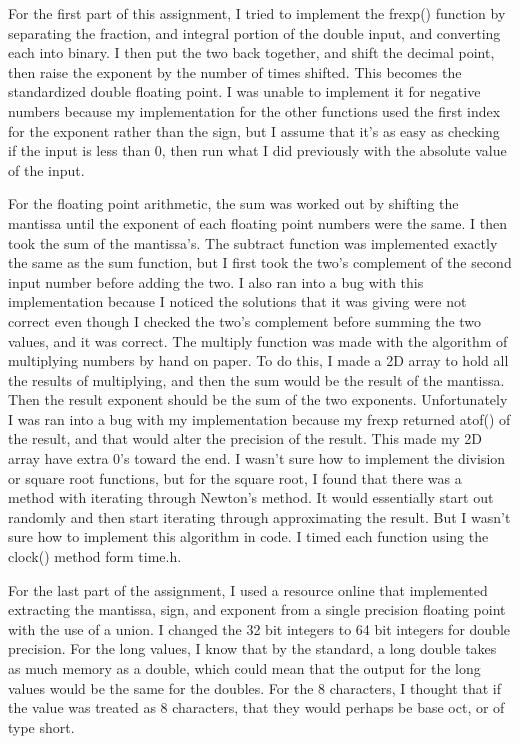 \documentclass[letterpaper,10pt,titlepage]{article}
\begin{document}
For the first part of this assignment, I tried to implement the frexp() function by separating the fraction, and integral portion of the double input, and converting each into binary. I then put the two back together, and shift the decimal point, then raise the exponent by the number of times shifted. This becomes the standardized double floating point. I was unable to implement it for negative numbers because my implementation for the other functions used the first index for the exponent rather than the sign, but I assume that it's as easy as checking if the input is less than 0, then run what I did previously with the absolute value of the input.\par

For the floating point arithmetic, the sum was worked out by shifting the mantissa until the exponent of each floating point numbers were the same. I then took the sum of the mantissa's. 
The subtract function was implemented exactly the same as the sum function, but I first took the two's complement of the second input number before adding the two. I also ran into a bug with this implementation because I noticed the solutions that it was giving were not correct even though I checked the two's complement before summing the two values, and it was correct. 
The multiply function was made with the algorithm of multiplying numbers by hand on paper. To do this, I made a 2D array to hold all the results of multiplying, and then the sum would be the result of the mantissa. Then the result exponent should be the sum of the two exponents. Unfortunately I was ran into a bug with my implementation because my frexp returned atof() of the result, and that would alter the precision of the result. This made my 2D array have extra 0's toward the end.
I wasn't sure how to implement the division or square root functions, but for the square root, I found that there was a method with iterating through Newton's method. It would essentially start out randomly and then start iterating through approximating the result. But I wasn't sure how to implement this algorithm in code.
I timed each function using the clock() method form time.h.\par

For the last part of the assignment, I used a resource online that implemented extracting the mantissa, sign, and exponent from a single precision floating point with the use of a union. I changed the 32 bit integers to 64 bit integers for double precision. 
For the long values, I know that by the standard, a long double takes as much memory as a double, which could mean that the output for the long values would be the same for the doubles. 
For the 8 characters, I thought that if the value was treated as 8 characters, that they would perhaps be base oct, or of type short.\par
%
\end{document}
